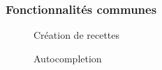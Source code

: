 \documentclass{beamer}
\begin{document}
\begin{frame}
	\frametitle{Fonctionnalités communes}
	\begin{multicols}{2}
		\begin{figure}
			\caption{Création de recettes}
		\end{figure}
		
		\columnbreak
		
		\begin{figure}
			\caption{Autocompletion}
		\end{figure}
	\end{multicols}
\end{frame}
\end{document}
